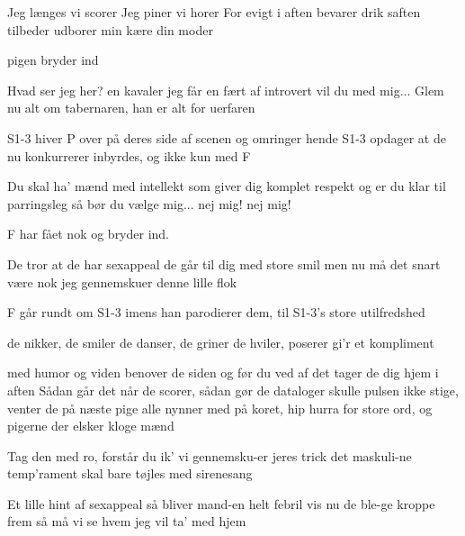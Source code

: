 \documentclass[a4paper,11pt]{article}
\begin{document}
\begin{song}
    Jeg længes
 vi scorer
    Jeg piner
 vi horer
    For evigt
 i aften
    bevarer
 drik saften
    tilbeder
 udborer
    min kære
 din moder

\scene pigen bryder ind

 Hvad ser jeg her?
	en kavaler 
	jeg får en fært
	af introvert
	vil du med mig... 
 Glem nu alt om tabernaren, han er alt for uerfaren

\scene S1-3 hiver P over på deres side af scenen og omringer hende
\scene S1-3 opdager at de nu konkurrerer inbyrdes, og ikke kun med F

 Du skal ha' mænd med intellekt
 som giver dig komplet respekt
 og er du klar til parringsleg
 så bør du vælge mig...
 nej mig!
 nej mig!

\scene F har fået nok og bryder ind.

 De tror at de har sexappeal
	de går til dig med store smil
	men nu må det snart være nok
	jeg gennemskuer denne lille flok

\scene F går rundt om S1-3 imens han parodierer dem, til S1-3's store utilfredshed

 de nikker, de smiler
	de danser, de griner
	de hviler, poserer
	gi'r et kompliment

	med humor og viden
	benover de siden
	og før du ved af det
	tager de dig hjem i aften
	Sådan går det når de scorer, sådan gør de dataloger
	skulle pulsen ikke stige, venter de på næste pige
	alle nynner med på koret, hip hurra for store ord, og
	pigerne der elsker kloge mænd

 Tag den med ro, forstår du ik'
    vi gennemsku-er jeres trick
    det maskuli-ne temp'rament
    skal bare tøjles med sirenesang

    Et lille hint af sexappeal
    så bliver mand-en helt febril
    vis nu de ble-ge kroppe frem
    så må vi se hvem jeg vil ta' med hjem


\end{song}
\end{document}
